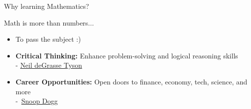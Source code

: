 \documentclass[9pt]{beamer}
\begin{document}
    

\begin{frame}{Why learning Mathematics?}

    Math is more than numbers...
    
    \begin{itemize}[leftmargin = 0.5cm, label = $\bullet$, rightmargin = 0.2cm]

        \item To pass the subject :)
        
        \item \textbf{Critical Thinking:} Enhance problem-solving and logical reasoning skills \\
         - \href{https://www.youtube.com/shorts/7OAsupLqQAo}{Neil deGrasse Tyson}
        
        \item \textbf{Career Opportunities:} Open doors to finance, economy, tech, science, and more \\
         -~\href{https://money.usnews.com/money/blogs/capital-commerce/2009/11/17/snoop-dogg-gives-business-advice}{Snoop Dogg}
        
        

        
        
        
    
    \end{itemize}

\end{frame}
\end{document}
